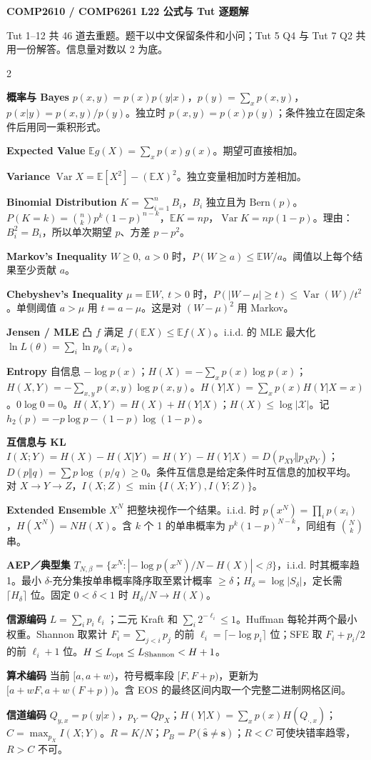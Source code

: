 \documentclass[a4paper]{article}
\newcommand{\bodyformat}{\fontsize{9.6}{13}\selectfont}
\newcommand{\cols}{2}
\newcommand{\bodyformat}{\fontsize{6.65}{7.8}\selectfont}
\newcommand{\cols}{4}
\newcommand{\topic}[1]{\par\addvspace{2.6pt}{\color{ink}\bfseries #1}\par\nobreak}
\newcommand{\form}[1]{\par\noindent\textbf{#1}\enspace}
\newcommand{\E}{\mathbb E}
\newcommand{\V}{\operatorname{Var}}
\newcommand{\B}{h_2}
\begin{document}
{\color{ink}\fontsize{13}{15}\selectfont\bfseries COMP2610 / COMP6261 \quad L22 公式与 Tut 逐题解}\par
{\fontsize{7}{8.4}\selectfont Tut 1–12 共 46 道去重题。题干以中文保留条件和小问；Tut 5 Q4 与 Tut 7 Q2 共用一份解答。信息量对数以 2 为底。\par}
\begin{multicols}{\cols}
\bodyformat\raggedright
\topic{公式区}
\form{概率与 Bayes} $p(x,y)=p(x)p(y|x)$，$p(y)=\sum_xp(x,y)$，$p(x|y)=p(x,y)/p(y)$。独立时 $p(x,y)=p(x)p(y)$；条件独立在固定条件后用同一乘积形式。
\form{Expected Value} $\E g(X)=\sum_x p(x)g(x)$。期望可直接相加。
\form{Variance} $\V X=\E[X^2]-(\E X)^2$。独立变量相加时方差相加。
\form{Binomial Distribution} $K=\sum_{i=1}^n B_i$，$B_i$ 独立且为 $\mathrm{Bern}(p)$。$P(K=k)=\binom nk p^k(1-p)^{n-k}$，$\E K=np$，$\V K=np(1-p)$。理由：$B_i^2=B_i$，所以单次期望 $p$、方差 $p-p^2$。
\form{Markov's Inequality} $W\ge0,\ a>0$ 时，$P(W\ge a)\le\E W/a$。阈值以上每个结果至少贡献 $a$。
\form{Chebyshev's Inequality} $\mu=\E W,\ t>0$ 时，$P(|W-\mu|\ge t)\le\V(W)/t^2$。单侧阈值 $a>\mu$ 用 $t=a-\mu$。这是对 $(W-\mu)^2$ 用 Markov。
\form{Jensen / MLE} 凸 $f$ 满足 $f(\E X)\le\E f(X)$。i.i.d. 的 MLE 最大化 $\ln L(\theta)=\sum_i\ln p_\theta(x_i)$。
\form{Entropy} 自信息 $-\log p(x)$；$H(X)=-\sum_xp(x)\log p(x)$；$H(X,Y)=-\sum_{x,y}p(x,y)\log p(x,y)$。$H(Y|X)=\sum_xp(x)H(Y|X=x)$。$0\log0=0$。$H(X,Y)=H(X)+H(Y|X)$；$H(X)\le\log|\mathcal X|$。记 $\B(p)=-p\log p-(1-p)\log(1-p)$。
\form{互信息与 KL} $I(X;Y)=H(X)-H(X|Y)=H(Y)-H(Y|X)=D(p_{XY}\Vert p_Xp_Y)$；$D(p\Vert q)=\sum p\log(p/q)\ge0$。条件互信息是给定条件时互信息的加权平均。对 $X\to Y\to Z$，$I(X;Z)\le\min\{I(X;Y),I(Y;Z)\}$。
\form{Extended Ensemble} $X^N$ 把整块视作一个结果。i.i.d. 时 $p(x^N)=\prod_i p(x_i)$，$H(X^N)=NH(X)$。含 $k$ 个 1 的单串概率为 $p^k(1-p)^{N-k}$，同组有 $\binom Nk$ 串。
\form{AEP／典型集} $T_{N,\beta}=\{x^N:|-\log p(x^N)/N-H(X)|<\beta\}$，i.i.d. 时其概率趋 1。最小 $\delta$-充分集按单串概率降序取至累计概率 $\ge\delta$；$H_\delta=\log|S_\delta|$，定长需 $\lceil H_\delta\rceil$ 位。固定 $0<\delta<1$ 时 $H_\delta/N\to H(X)$。
\form{信源编码} $L=\sum_i p_i\ell_i$；二元 Kraft 和 $\sum_i2^{-\ell_i}\le1$。Huffman 每轮并两个最小权重。Shannon 取累计 $F_i=\sum_{j<i}p_j$ 的前 $\ell_i=\lceil-\log p_i\rceil$ 位；SFE 取 $F_i+p_i/2$ 的前 $\ell_i+1$ 位。$H\le L_{\rm opt}\le L_{\rm Shannon}<H+1$。
\form{算术编码} 当前 $[a,a+w)$，符号概率段 $[F,F+p)$，更新为 $[a+wF,a+w(F+p))$。含 EOS 的最终区间内取一个完整二进制网格区间。
\form{信道编码} $Q_{y,x}=p(y|x)$，$p_Y=Qp_X$；$H(Y|X)=\sum_xp(x)H(Q_{\cdot,x})$；$C=\max_{p_X}I(X;Y)$。$R=K/N$；$P_B=P(\hat{\mathbf s}\ne\mathbf s)$；$R<C$ 可使块错率趋零，$R>C$ 不可。


\end{multicols}
\end{document}

